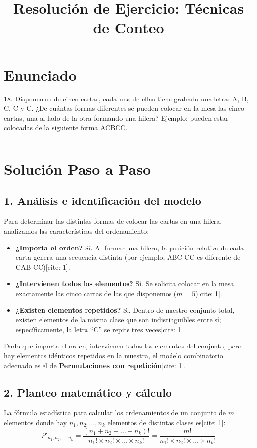 \documentclass[12pt, a4paper]{article}
\title{Resolución de Ejercicio: Técnicas de Conteo}
\author{}
\date{}
\begin{document}
\maketitle

\section*{Enunciado}
18. Disponemos de cinco cartas, cada una de ellas tiene grabada una letra: A, B, C, C y C. ¿De cuántas formas diferentes se pueden colocar en la mesa las cinco cartas, una al lado de la otra formando una hilera? Ejemplo: pueden estar colocadas de la siguiente forma ACBCC.

\vspace{0.5cm}
\hrule
\vspace{0.5cm}

\section*{Solución Paso a Paso}

\subsection*{1. Análisis e identificación del modelo}
Para determinar las distintas formas de colocar las cartas en una hilera, analizamos las características del ordenamiento:
\begin{itemize}[label=\checkmark]
    \item \textbf{¿Importa el orden?} Sí. Al formar una hilera, la posición relativa de cada carta genera una secuencia distinta (por ejemplo, ABC CC es diferente de CAB CC)[cite: 1].
    \item \textbf{¿Intervienen todos los elementos?} Sí. Se solicita colocar en la mesa exactamente las cinco cartas de las que disponemos ($m=5$)[cite: 1].
    \item \textbf{¿Existen elementos repetidos?} Sí. Dentro de nuestro conjunto total, existen elementos de la misma clase que son indistinguibles entre sí; específicamente, la letra ``C'' se repite tres veces[cite: 1].
\end{itemize}

Dado que importa el orden, intervienen todos los elementos del conjunto, pero hay elementos idénticos repetidos en la muestra, el modelo combinatorio adecuado es el de \textbf{Permutaciones con repetición}[cite: 1].

\subsection*{2. Planteo matemático y cálculo}
La fórmula estadística para calcular los ordenamientos de un conjunto de $m$ elementos donde hay $n_1, n_2, \dots, n_k$ elementos de distintas clases es[cite: 1]:
\[ P'_{n_1, n_2, \dots, n_k} = \frac{(n_1 + n_2 + \dots + n_k)!}{n_1! \times n_2! \times \dots \times n_k!} = \frac{m!}{n_1! \times n_2! \times \dots \times n_k!} \]
\end{document}

